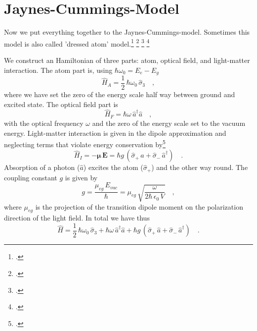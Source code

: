 \section{Jaynes-Cummings-Model}
Now we put everything together to  the Jaynes-Cummings-model. Sometimes this model is also called 'dressed atom' model.\footcite[chap. 6.8]{Rand2016} \footcite[chap. 4.5]{GerryKnight2005} \footcite[chap. 10.4]{Fox}  \footcite[chap. 3.4]{HarocheRaimond2006}

We construct an Hamiltonian of three parts:  atom, optical field, and light-matter interaction. The atom part is, using $\hbar \omega_0 = E_e - E_g$ 
\begin{equation}
\hat{H}_A = \frac{1}{2} \, \hbar \omega_0 \, \hat{\sigma}_3 \quad ,
\end{equation}
where we have set the zero of the energy scale half way between ground and excited state. The optical field part is
\begin{equation}
\hat{H}_F = \hbar \omega \, \hat{a}^\dagger  \hat{a} \quad ,
\end{equation}
with the optical frequency $\omega$ and the zero of the energy scale set to the vacuum energy. Light-matter interaction is given in the dipole approximation and neglecting terms that violate energy conservation by\footcite[chap. 6.7.1]{Rand2016}
\begin{equation}
\hat{H}_I = - \boldsymbol{\mu} \, \boldsymbol{E} =
 \hbar g \, (\hat{\sigma}_+ \, \hat{a} + \hat{\sigma}_- \,\hat{a}^\dagger )  \quad .
\end{equation}
Absorption of a photon ($\hat{a}$) excites the atom ($\hat{\sigma}_+$) and the other way round.
The coupling constant $g$ is given by
\begin{equation}
 g = \frac{\mu_{eg} \, E_{vac} }{\hbar}
 =
  \mu_{eg} \, \sqrt{\frac{\omega}{2 \hbar \, \epsilon_0 \, V}}  \quad ,
\end{equation}
where $\mu_{eg} $ is the projection of the transition dipole moment on the polarization direction of the light field. In total we have thus
\begin{equation}
 \hat{H} = \frac{1}{2} \, \hbar \omega_0 \, \hat{\sigma}_3 
 +  \hbar \omega \, \hat{a}^\dagger \hat{a}
 + \hbar g \, (\hat{\sigma}_+ \, \hat{a} + \hat{\sigma}_- \,\hat{a}^\dagger )  \quad .
\end{equation}

